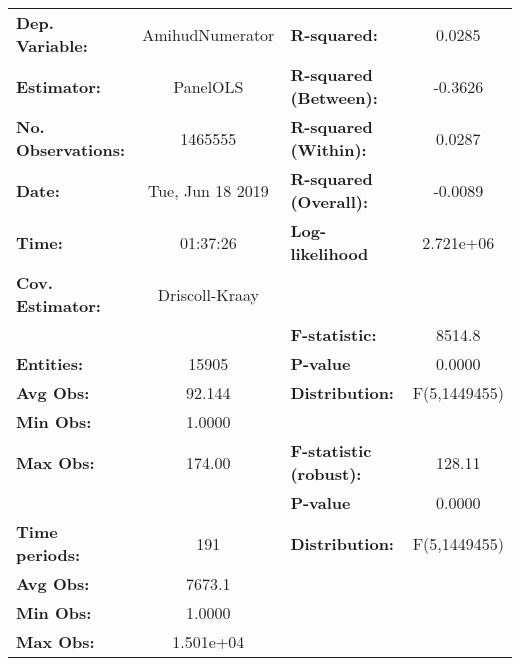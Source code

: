 \begin{center}
\begin{tabular}{lclc}
\toprule
\textbf{Dep. Variable:}                 &  AmihudNumerator   & \textbf{  R-squared:         }   &      0.0285      \\
\textbf{Estimator:}                     &      PanelOLS      & \textbf{  R-squared (Between):}  &     -0.3626      \\
\textbf{No. Observations:}              &      1465555       & \textbf{  R-squared (Within):}   &      0.0287      \\
\textbf{Date:}                          &  Tue, Jun 18 2019  & \textbf{  R-squared (Overall):}  &     -0.0089      \\
\textbf{Time:}                          &      01:37:26      & \textbf{  Log-likelihood     }   &    2.721e+06     \\
\textbf{Cov. Estimator:}                &   Driscoll-Kraay   & \textbf{                     }   &                  \\
\textbf{}                               &                    & \textbf{  F-statistic:       }   &      8514.8      \\
\textbf{Entities:}                      &       15905        & \textbf{  P-value            }   &      0.0000      \\
\textbf{Avg Obs:}                       &       92.144       & \textbf{  Distribution:      }   &   F(5,1449455)   \\
\textbf{Min Obs:}                       &       1.0000       & \textbf{                     }   &                  \\
\textbf{Max Obs:}                       &       174.00       & \textbf{  F-statistic (robust):} &      128.11      \\
\textbf{}                               &                    & \textbf{  P-value            }   &      0.0000      \\
\textbf{Time periods:}                  &        191         & \textbf{  Distribution:      }   &   F(5,1449455)   \\
\textbf{Avg Obs:}                       &       7673.1       & \textbf{                     }   &                  \\
\textbf{Min Obs:}                       &       1.0000       & \textbf{                     }   &                  \\
\textbf{Max Obs:}                       &     1.501e+04      & \textbf{                     }   &                  \\

\end{tabular}
\end{center}
